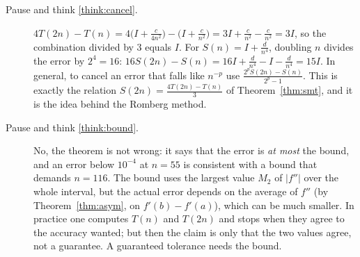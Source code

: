 \documentclass[11pt]{article}
\begin{document}
\begin{description}
  \item[Pause and think \ref{think:cancel}.] $4T(2n)-T(n)=4\bigl(I+\frac c{4n^2}\bigr)-\bigl(I+\frac c{n^2}\bigr)=3I+\frac c{n^2}-\frac c{n^2}=3I$, so the combination divided by $3$ equals $I$. For $S(n)=I+\frac d{n^4}$, doubling $n$ divides the error by $2^4=16$: $16S(2n)-S(n)=16I+\frac d{n^4}-I-\frac d{n^4}=15I$. In general, to cancel an error that falls like $n^{-p}$ use $\frac{2^pS(2n)-S(n)}{2^p-1}$. This is exactly the relation $S(2n)=\frac{4T(2n)-T(n)}3$ of Theorem~\ref{thm:smt}, and it is the idea behind the Romberg method.

  \item[Pause and think \ref{think:bound}.] No, the theorem is not wrong: it says that the error is \emph{at most} the bound, and an error below $10^{-4}$ at $n=55$ is consistent with a bound that demands $n=116$. The bound uses the largest value $M_2$ of $\lvert f''\rvert$ over the whole interval, but the actual error depends on the average of $f''$ (by Theorem~\ref{thm:asym}, on $f'(b)-f'(a)$), which can be much smaller. In practice one computes $T(n)$ and $T(2n)$ and stops when they agree to the accuracy wanted; but then the claim is only that the two values agree, not a guarantee. A guaranteed tolerance needs the bound.
\end{description}
\end{document}
